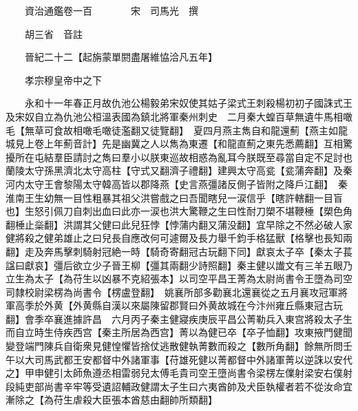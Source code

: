 










 


 
 


 

  
  
  
  
  





  
  
  
  
  
 
  

  

  
  
  



  

 
 

  
   




  

  
  


  　　資治通鑑卷一百　　　　宋　司馬光　撰

　　胡三省　音註

　　晉紀二十二【起旃蒙單閼盡屠維恊洽凡五年】

　　孝宗穆皇帝中之下

　　永和十一年春正月故仇池公楊毅弟宋奴使其姑子梁式王刺殺楊初初子國誅式王及宋奴自立為仇池公桓溫表國為鎮北將軍秦州刺史　二月秦大蝗百草無遺牛馬相噉毛【無草可食故相噉毛噉徒濫翻又徒覽翻】　夏四月燕主雋自和龍還薊【燕主如龍城見上卷上年薊音計】先是幽冀之人以雋為東遷【和龍直薊之東先悉薦翻】互相驚擾所在屯結羣臣請討之雋曰羣小以朕東巡故相惑為亂耳今朕既至尋當自定不足討也　蘭陵太守孫黑濟北太守高柱【守式又翻濟子禮翻】建興太守高瓫【瓫蒲奔翻】及秦河内太守王會黎陽太守韓高皆以郡降燕【史言燕彊諸反側子皆附之降戶江翻】　秦淮南王生幼無一目性粗暴其祖父洪嘗戲之曰吾聞瞎兒一涙信乎【瞎許轄翻一目盲也】生怒引佩刀自刺出血曰此亦一涙也洪大驚鞭之生曰性耐刀槊不堪鞭棰【槊色角翻棰止橤翻】洪謂其父健曰此兒狂悖【悖蒲内翻又蒲没翻】宜早除之不然必破人家健將殺之健弟雄止之曰兒長自應改何可遽爾及長力舉千鈞手格猛獸【格擊也長知兩翻】走及奔馬擊刺騎射冠絶一時【騎奇寄翻冠古玩翻下同】獻哀太子卒【秦太子萇諡曰獻哀】彊后欲立少子晉王柳【彊其兩翻少詩照翻】秦主健以䜟文有三羊五眼乃立生為太子【為苻生以凶暴不克紹張本】以司空平昌王菁為太尉尚書令王墮為司空司隸校尉梁楞為尚書令【楞盧登翻】　姚襄所部多勸襄北還襄從之五月襄攻冠軍將軍高季於外黄【外黄縣自漢以來屬陳留郡賢曰外黄故城在今汴州雍丘縣東冠古玩翻】會季卒襄進據許昌　六月丙子秦主健寢疾庚辰平昌公菁勒兵入東宫將殺太子生而自立時生侍疾西宫【秦主所居為西宫】菁以為健已卒【卒子恤翻】攻東掖門健聞變登端門陳兵自衛衆見健惶懼皆捨仗逃散健執菁數而殺之【數所角翻】餘無所問壬午以大司馬武都王安都督中外諸軍事【苻雄死健以菁都督中外諸軍菁以逆誅以安代之】甲申健引太師魚遵丞相雷弱兒太傅毛貴司空王墮尚書令梁楞左㒒射梁安右僕射段純吏部尚書辛牢等受遺詔輔政健謂太子生曰六夷酋帥及犬臣執權者若不從汝命宜漸除之【為苻生虐殺大臣張本酋慈由翻帥所類翻】

